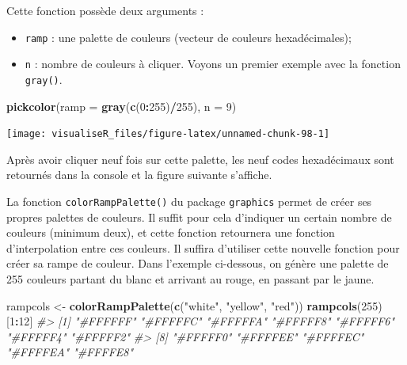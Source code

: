 \documentclass[]{article}
\newenvironment{Shaded}{\begin{snugshade}}{\end{snugshade}}
\newcommand{\CommentTok}[1]{\textcolor[rgb]{0.56,0.35,0.01}{\textit{#1}}}
\newcommand{\DataTypeTok}[1]{\textcolor[rgb]{0.13,0.29,0.53}{#1}}
\newcommand{\DecValTok}[1]{\textcolor[rgb]{0.00,0.00,0.81}{#1}}
\newcommand{\KeywordTok}[1]{\textcolor[rgb]{0.13,0.29,0.53}{\textbf{#1}}}
\newcommand{\NormalTok}[1]{#1}
\newcommand{\OperatorTok}[1]{\textcolor[rgb]{0.81,0.36,0.00}{\textbf{#1}}}
\newcommand{\StringTok}[1]{\textcolor[rgb]{0.31,0.60,0.02}{#1}}
\providecommand{\tightlist}{%
  \setlength{\itemsep}{0pt}\setlength{\parskip}{0pt}}
\begin{document}
Cette fonction possède deux arguments :

\begin{itemize}
\tightlist
\item
  \texttt{ramp} : une palette de couleurs (vecteur de couleurs hexadécimales);
\item
  \texttt{n} : nombre de couleurs à cliquer.
  Voyons un premier exemple avec la fonction \texttt{gray()}.
\end{itemize}

\begin{Shaded}
\begin{Highlighting}[]
\KeywordTok{pickcolor}\NormalTok{(}\DataTypeTok{ramp =} \KeywordTok{gray}\NormalTok{(}\KeywordTok{c}\NormalTok{(}\DecValTok{0}\OperatorTok{:}\DecValTok{255}\NormalTok{)}\OperatorTok{/}\DecValTok{255}\NormalTok{), }\DataTypeTok{n =} \DecValTok{9}\NormalTok{)}
\end{Highlighting}
\end{Shaded}

\begin{center}\texttt{[image: visualiseR\_files/figure-latex/unnamed-chunk-98-1]} \end{center}

Après avoir cliquer neuf fois sur cette palette, les neuf codes hexadécimaux sont retournés dans la console et la figure suivante s'affiche.

La fonction \texttt{colorRampPalette()} du package \texttt{graphics} permet de créer ses propres palettes de couleurs. Il suffit pour cela d'indiquer un certain nombre de couleurs (minimum deux), et cette fonction retournera une fonction d'interpolation entre ces couleurs. Il suffira d'utiliser cette nouvelle fonction pour créer sa rampe de couleur. Dans l'exemple ci-dessous, on génère une palette de 255 couleurs partant du blanc et arrivant au rouge, en passant par le jaune.

\begin{Shaded}
\begin{Highlighting}[]
\NormalTok{rampcols <-}\StringTok{ }\KeywordTok{colorRampPalette}\NormalTok{(}\KeywordTok{c}\NormalTok{(}\StringTok{"white"}\NormalTok{, }\StringTok{"yellow"}\NormalTok{, }\StringTok{"red"}\NormalTok{))}
\KeywordTok{rampcols}\NormalTok{(}\DecValTok{255}\NormalTok{)[}\DecValTok{1}\OperatorTok{:}\DecValTok{12}\NormalTok{]}
\CommentTok{#>  [1] "#FFFFFF" "#FFFFFC" "#FFFFFA" "#FFFFF8" "#FFFFF6" "#FFFFF4" "#FFFFF2"}
\CommentTok{#>  [8] "#FFFFF0" "#FFFFEE" "#FFFFEC" "#FFFFEA" "#FFFFE8"}
\end{Highlighting}
\end{Shaded}
\end{document}
